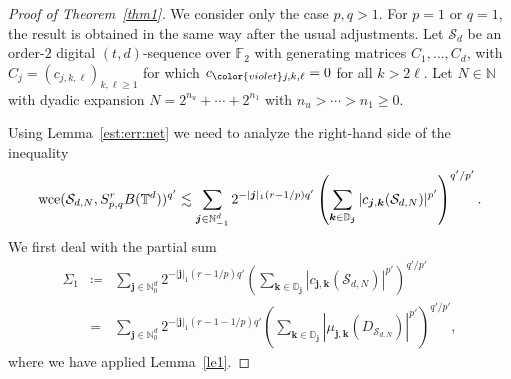 \documentclass[12pt, a4paper]{article}
\def\S{\mathcal{S}}
\newcommand{\wce}{{\rm wce}}
\newcommand{\peter}[1]{\begingroup\color{violet}#1\endgroup}
\newcommand{\N}{{\mathbb{N}}} %
\newcommand{\bsj}{{\boldsymbol{j}}}
\newcommand{\bsk}{{\boldsymbol{k}}}
\newcommand{\bbT}{{\mathbb{T}}}
\newcommand{\bbN}{{\mathbb{N}}}
\newcommand{\bbD}{{\mathbb{D}}}
\begin{document}
\begin{proof}[Proof of Theorem~\ref{thm1}]
We consider only the case $p,q>1$. For $p=1$ or $q=1$, the result is obtained in the same way after the usual adjustments. Let $\S_d$ be an order-$2$ digital $(t,d)$-sequence over $\mathbb{F}_2$ with generating matrices $C_1,\ldots,C_d$, with $C_j = (c_{j,k,\ell})_{k, \ell \ge 1}$ for which $c_{\peter{j},k,\ell} = 0$ for all $k > 2 \ell$. Let $N \in \N$ with dyadic expansion $N=2^{n_u}+\cdots+2^{n_1}$ with $n_u>\cdots>n_1\geq 0$. 

Using Lemma~\ref{est:err:net} we need to analyze the right-hand side of the inequality
\begin{equation*}
\wce(\S_{d,N}, S^r_{p, q}B(\bbT^d))^{q'} \lesssim \sum_{\bsj \in \bbN_{-1}^d} 2^{-|\bsj|_1 (r-1/p) q'} \left(\sum_{\bsk \in \bbD_{\bsj}} |c_{\bsj, \bsk}(\S_{d,N})|^{p'}\right)^{q'/p'}.
\end{equation*}
We first deal with the partial sum
\begin{eqnarray*}
\Sigma_1 & \coloneqq &\sum_{\bsj \in \bbN_{0}^d} 2^{-|\bsj|_1 (r-1/p) q'} \left(\sum_{\bsk \in \bbD_{\bsj}} |c_{\bsj, \bsk}(\S_{d,N})|^{p'}\right)^{q'/p'}\\
& = & \sum_{\bsj \in \bbN_{0}^d} 2^{-|\bsj|_1 (r-1-1/p) q'} \left(\sum_{\bsk \in \bbD_{\bsj}} |\mu_{\bsj, \bsk}(D_{\S_{d,N}})|^{p'}\right)^{q'/p'},
\end{eqnarray*}
where we have applied Lemma~\ref{le1}.


\end{proof}
\end{document}
